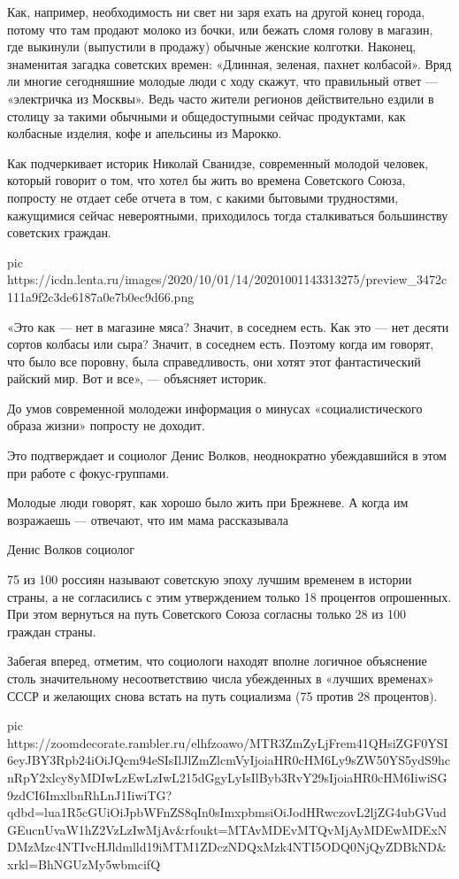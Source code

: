 Как, например, необходимость ни свет ни заря ехать на другой конец города,
потому что там продают молоко из бочки, или бежать сломя голову в магазин, где
выкинули (выпустили в продажу) обычные женские колготки. Наконец, знаменитая
загадка советских времен: «Длинная, зеленая, пахнет колбасой». Вряд ли многие
сегодняшние молодые люди с ходу скажут, что правильный ответ --- «электричка из
Москвы». Ведь часто жители регионов действительно ездили в столицу за такими
обычными и общедоступными сейчас продуктами, как колбасные изделия, кофе и
апельсины из Марокко.

Как подчеркивает историк Николай Сванидзе, современный молодой человек, который
говорит о том, что хотел бы жить во времена Советского Союза, попросту не
отдает себе отчета в том, с какими бытовыми трудностями, кажущимися сейчас
невероятными, приходилось тогда сталкиваться большинству советских граждан.

\ifcmt
pic https://icdn.lenta.ru/images/2020/10/01/14/20201001143313275/preview_3472c111a9f2c3de6187a0e7b0ec9d66.png
\fi

«Это как --- нет в магазине мяса? Значит, в соседнем есть. Как это --- нет десяти
сортов колбасы или сыра? Значит, в соседнем есть. Поэтому когда им говорят, что
было все поровну, была справедливость, они хотят этот фантастический райский
мир. Вот и все», --- объясняет историк.

До умов современной молодежи информация о минусах «социалистического образа
жизни» попросту не доходит.

Это подтверждает и социолог Денис Волков, неоднократно убеждавшийся в этом при
работе с фокус-группами.

Молодые люди говорят, как хорошо было жить при Брежневе. А когда им возражаешь
--- отвечают, что им мама рассказывала

Денис Волков социолог

75 из 100 россиян называют советскую эпоху лучшим временем в истории страны, а
не согласились с этим утверждением только 18 процентов опрошенных. При этом
вернуться на путь Советского Союза согласны только 28 из 100 граждан страны.

Забегая вперед, отметим, что социологи находят вполне логичное объяснение столь
значительному несоответствию числа убежденных в «лучших временах» СССР и
желающих снова встать на путь социализма (75 против 28 процентов).

\ifcmt
pic https://zoomdecorate.rambler.ru/elhfzoawo/MTR3ZmZyLjFrem41QHsiZGF0YSI6eyJBY3Rpb24iOiJQcm94eSIsIlJlZmZlcmVyIjoiaHR0cHM6Ly9sZW50YS5ydS9hcnRpY2xlcy8yMDIwLzEwLzIwL215dGgyLyIsIlByb3RvY29sIjoiaHR0cHM6IiwiSG9zdCI6ImxlbnRhLnJ1IiwiTG?qdbd=lua1R5cGUiOiJpbWFnZS8qIn0sImxpbmsiOiJodHRwczovL2ljZG4ubGVudGEucnUvaW1hZ2VzLzIwMjAv&rfoukt=MTAvMDEvMTQvMjAyMDEwMDExNDMzMzc4NTIvcHJldmlld19iMTM1ZDczNDQxMzk4NTI5ODQ0NjQyZDBkND&xrkl=BhNGUzMy5wbmcifQ%
\fi
 
